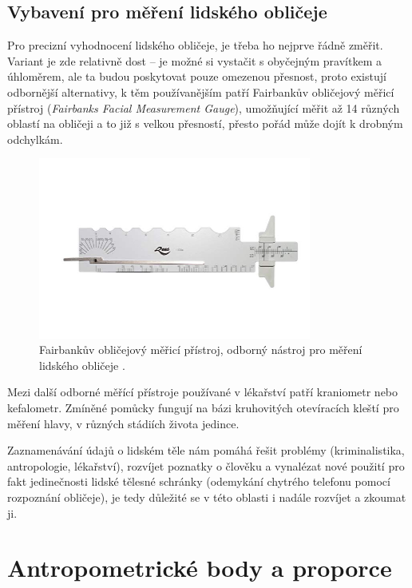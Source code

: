 \subsection*{Vybavení pro měření lidského obličeje}

Pro precizní vyhodnocení lidského obličeje, je třeba ho nejprve řádně změřit. Variant je zde relativně dost -- je možné si vystačit s obyčejným pravítkem a úhloměrem, ale ta budou poskytovat pouze omezenou přesnost, proto existují odbornější alternativy, k těm používanějším patří Fairbankův obličejový měřicí přístroj (\textit{Fairbanks Facial Measurement Gauge}), umožňující měřit až 14 různých oblastí na obličeji a to již s velkou přesností, přesto pořád může dojít k drobným odchylkám.

\begin{figure}[hbt]
	\centering
	\includegraphics[width=0.8\textwidth]{obrazky-figures/fairbanks-facial-gauge.jpg}
	\caption{Fairbankův obličejový měřicí přístroj, odborný nástroj pro měření lidského obličeje \cite{Fairbank}.}
\end{figure}

\noindent Mezi další odborné měřící přístroje používané v lékařství patří kraniometr nebo kefalometr. Zmíněné pomůcky fungují na bázi kruhovitých otevíracích kleští pro měření hlavy, v různých stádiích života jedince.

\bigskip

\noindent Zaznamenávání údajů o lidském těle nám pomáhá řešit problémy (kriminalistika, antropologie, lékařství), rozvíjet poznatky o člověku a vynalézat nové použití pro fakt jedinečnosti lidské tělesné schránky (odemykání chytrého telefonu pomocí rozpoznání obličeje), je tedy důležité se v této oblasti i nadále rozvíjet a zkoumat ji.

\section{Antropometrické body a proporce}
\label{facial-landmarks}

